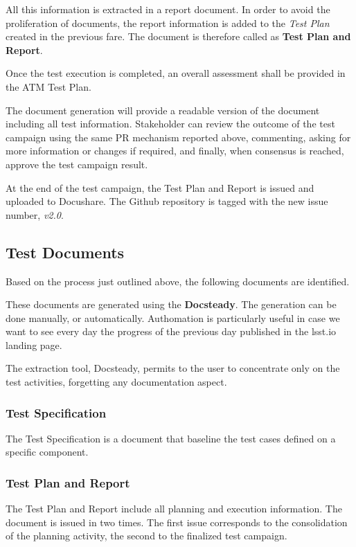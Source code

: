 All this information is extracted in a report document.
In order to avoid the proliferation of documents, the  report information is added to the \textit{Test Plan} created in the previous fare.
The document is therefore called as \textbf{Test Plan and Report}.

Once the test execution is completed, an overall assessment shall be provided in the ATM Test Plan.

The document generation will provide a readable version of the document including all test information.
Stakeholder can review the outcome of the test campaign using the same PR mechanism reported above, 
commenting, asking for more information or changes if required, and finally, when consensus is reached, approve the test campaign result.

At the end of the test campaign, the Test Plan and Report is issued and uploaded to Docushare.
The Github repository is tagged with the new issue number, \textit{v2.0}.


\subsection{Test Documents}

Based on the process just outlined above, the following documents are identified.

These documents are generated using the \textbf{Docsteady}.
The generation can be done manually, or automatically.
Authomation is particularly useful in case we want to see every day the progress of the previous day published in the lsst.io landing page.

The extraction tool, Docsteady, permits to the user to concentrate only on the test activities,
forgetting any documentation aspect.


\subsubsection{Test Specification}

The Test Specification is a document that baseline the test cases defined on a specific component.


\subsubsection{Test Plan and Report}

The Test Plan and Report include all planning and execution information. 
The document  is issued in two times. The first issue corresponds to the consolidation of the planning activity, 
the second to the finalized test campaign.


